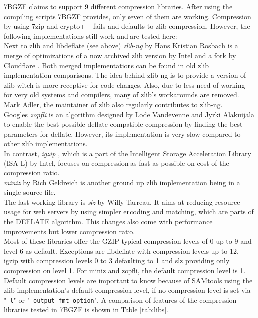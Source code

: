 7BGZF claims to support 9 different compression libraries. 
After using the compiling scripts 7BGZF provides, only seven of them are working. Compression by using 7zip and crypto++ fails and defaults to zlib compression. However, the following implementations still work and are tested here:\\
Next to zlib and libdeflate (see above) \textit{zlib-ng} \cite{noauthor_zlib-ngzlib-ng_2024} by Hans Kristian Rosbach is a merge of optimizations of a now archived zlib version by Intel \cite{noauthor_intelzlib_2024} and a fork by Cloudflare \cite{noauthor_cloudflarezlib_2024}. Both merged implementations can be found in old zlib implementation comparisons. The idea behind zlib-ng is to provide a version of zlib witch is more receptive for code changes. Also, due to less need of working for very old systems and compilers, many of zlib's workarounds are removed. Mark Adler, the maintainer of zlib also regularly contributes to zlib-ng.\\
Googles \textit{zopfli} \cite{noauthor_googlezopfli_2024} is an algorithm designed by Lode Vandevenne and Jyrki Alakuijala to enable the best possible deflate compatible compression by finding the best parameters for deflate. However, its implementation is very slow compared to other zlib implementations. \\
In contrast, \textit{igzip} \cite{tucker_isa-l_2017}, which is a part of the Intelligent Storage Acceleration Library (ISA-L) \cite{noauthor_intelisa-l_2024} by Intel, focuses on compression as fast as possible on cost of the compression ratio. \\
\textit{miniz} \cite{noauthor_richgel999miniz_nodate} by Rich Geldreich is another ground up zlib implementation being in a single source file. \\
The last working library is \textit{slz} \cite{tarreau_wtarreaulibslz_2024} by Willy Tarreau. It aims at reducing resource usage for web servers by using simpler encoding and matching, which are parts of the DEFLATE algorithm. This changes also come with performance improvements but lower compression ratio.\\

Most of these libraries offer the GZIP-typical compression levels of 0 up to 9 and level 6 as default. Exceptions are libdeflate with compression levels up to 12, igzip with compression levels 0 to 3 defaulting to 1 and slz providing only compression on level 1. For miniz and zopfli, the default compression level is 1. Default compression levels are important to know because of SAMtools using the zlib implementation's default compression level, if no compression level is set via "\texttt{-l}" or "\texttt{--output-fmt-option}". A comparison of features of the compression libraries tested in 7BGZF is shown in Table \ref{tab:libs}.

